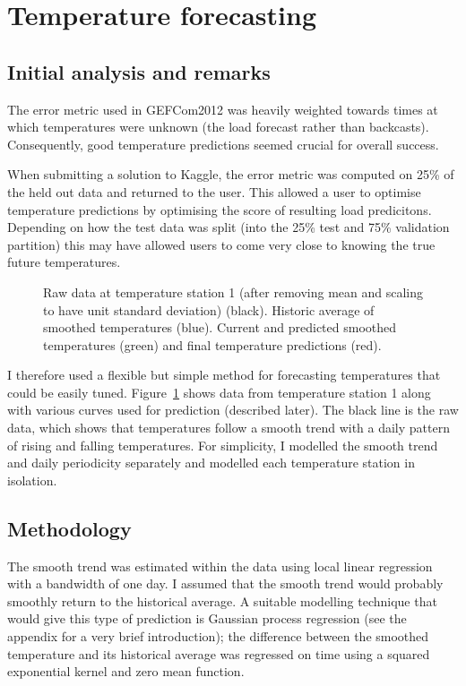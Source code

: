 \documentclass[preprint,authoryear,12pt]{elsarticle}
\begin{document}
\section{Temperature forecasting}

\subsection{Initial analysis and remarks}

The error metric used in GEFCom2012 was heavily weighted towards times at which temperatures were unknown (\ie the load forecast rather than backcasts).
Consequently, good temperature predictions seemed crucial for overall success.

When submitting a solution to Kaggle, the error metric was computed on 25\% of the held out data and returned to the user.
This allowed a user to optimise temperature predictions by optimising the score of resulting load predicitons.
Depending on how the test data was split (into the 25\% test and 75\% validation partition) this may have allowed users to come very close to knowing the true future temperatures.

\begin{figure}[ht]
  \begin{center}
    
  \end{center}
  \caption{Raw data at temperature station 1 (after removing mean and scaling to have unit standard deviation) (black). Historic average of smoothed temperatures (blue). Current and predicted smoothed temperatures (green) and final temperature predictions (red).}
  \label{fig:temp_pred}
\end{figure}

I therefore used a flexible but simple method for forecasting temperatures that could be easily tuned.
Figure~\ref{fig:temp_pred} shows data from temperature station 1 along with various curves used for prediction (described later).
The black line is the raw data, which shows that temperatures follow a smooth trend with a daily pattern of rising and falling temperatures.
For simplicity, I modelled the smooth trend and daily periodicity separately and modelled each temperature station in isolation.

\subsection{Methodology}

The smooth trend was estimated within the data using local linear regression \citep[e.g. chapter 6 of][]{Hastie2009} with a bandwidth of one day.
I assumed that the smooth trend would probably smoothly return to the historical average.
A suitable modelling technique that would give this type of prediction is Gaussian process regression \citep[e.g.][]{Rasmussen2006} (see the appendix for a very brief introduction); the difference between the smoothed temperature and its historical average was regressed on time using a squared exponential kernel and zero mean function.
\end{document}
